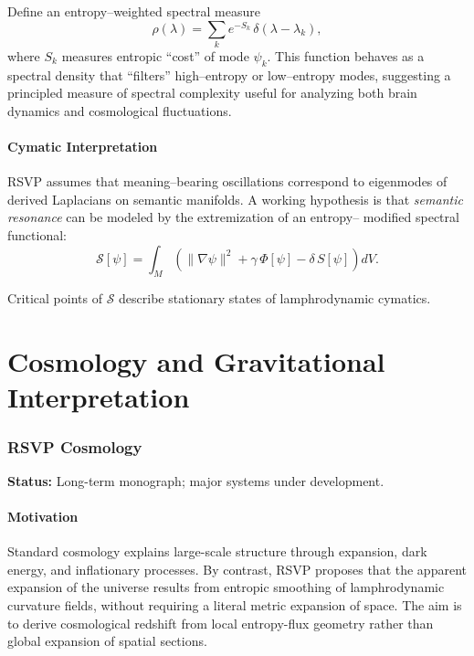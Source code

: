 \documentclass[12pt]{article}
\theoremstyle{plain}
\theoremstyle{definition}
\theoremstyle{remark}
\begin{document}
Define an entropy--weighted spectral measure
\[
    \rho(\lambda) = \sum_k e^{-S_k}\,\delta(\lambda-\lambda_k),
\]
where $S_k$ measures entropic ``cost'' of mode $\psi_k$. This function behaves
as a spectral density that ``filters'' high--entropy or low--entropy modes,
suggesting a principled measure of spectral complexity useful for analyzing both
brain dynamics and cosmological fluctuations.


\subsection{Cymatic Interpretation}

RSVP assumes that meaning--bearing oscillations correspond to eigenmodes of
derived Laplacians on semantic manifolds. A working hypothesis is that
\emph{semantic resonance} can be modeled by the extremization of an entropy--
modified spectral functional:
\[
    \mathcal{S}[\psi] = \int_M
    \left(
        \|\nabla\psi\|^2 + \gamma\,\Phi[\psi] - \delta\,S[\psi]
    \right)dV.
\]

Critical points of $\mathcal{S}$ describe stationary states of lamphrodynamic
cymatics.

\newpage

\part{Cosmology and Gravitational Interpretation}


\section{RSVP Cosmology}

\textbf{Status:} Long-term monograph; major systems under development.

\subsection{Motivation}

Standard cosmology explains large-scale structure through expansion, dark
energy, and inflationary processes. By contrast, RSVP proposes that the
apparent expansion of the universe results from entropic smoothing of
lamphrodynamic curvature fields, without requiring a literal metric expansion
of space. The aim is to derive cosmological redshift from local
entropy-flux geometry rather than global expansion of spatial sections.
\end{document}
